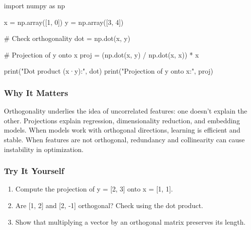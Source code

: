 \documentclass[
  letterpaper,
  DIV=11,
  numbers=noendperiod]{scrreprt}
\newenvironment{Shaded}{\begin{snugshade}}{\end{snugshade}}
\newcommand{\BuiltInTok}[1]{\textcolor[rgb]{0.00,0.23,0.31}{#1}}
\newcommand{\CommentTok}[1]{\textcolor[rgb]{0.37,0.37,0.37}{#1}}
\newcommand{\DecValTok}[1]{\textcolor[rgb]{0.68,0.00,0.00}{#1}}
\newcommand{\ImportTok}[1]{\textcolor[rgb]{0.00,0.46,0.62}{#1}}
\newcommand{\NormalTok}[1]{\textcolor[rgb]{0.00,0.23,0.31}{#1}}
\newcommand{\OperatorTok}[1]{\textcolor[rgb]{0.37,0.37,0.37}{#1}}
\newcommand{\StringTok}[1]{\textcolor[rgb]{0.13,0.47,0.30}{#1}}
\providecommand{\tightlist}{%
  \setlength{\itemsep}{0pt}\setlength{\parskip}{0pt}}
\begin{document}
\begin{Shaded}
\begin{Highlighting}[]
\ImportTok{import}\NormalTok{ numpy }\ImportTok{as}\NormalTok{ np}

\NormalTok{x }\OperatorTok{=}\NormalTok{ np.array([}\DecValTok{1}\NormalTok{, }\DecValTok{0}\NormalTok{])}
\NormalTok{y }\OperatorTok{=}\NormalTok{ np.array([}\DecValTok{3}\NormalTok{, }\DecValTok{4}\NormalTok{])}

\CommentTok{\# Check orthogonality}
\NormalTok{dot }\OperatorTok{=}\NormalTok{ np.dot(x, y)}

\CommentTok{\# Projection of y onto x}
\NormalTok{proj }\OperatorTok{=}\NormalTok{ (np.dot(x, y) }\OperatorTok{/}\NormalTok{ np.dot(x, x)) }\OperatorTok{*}\NormalTok{ x}

\BuiltInTok{print}\NormalTok{(}\StringTok{"Dot product (x·y):"}\NormalTok{, dot)}
\BuiltInTok{print}\NormalTok{(}\StringTok{"Projection of y onto x:"}\NormalTok{, proj)}
\end{Highlighting}
\end{Shaded}

\subsubsection{Why It Matters}\label{why-it-matters-3}

Orthogonality underlies the idea of uncorrelated features: one doesn't
explain the other. Projections explain regression, dimensionality
reduction, and embedding models. When models work with orthogonal
directions, learning is efficient and stable. When features are not
orthogonal, redundancy and collinearity can cause instability in
optimization.

\subsubsection{Try It Yourself}\label{try-it-yourself-105}

\begin{enumerate}
\def\labelenumi{\arabic{enumi}.}
\tightlist
\item
  Compute the projection of y = {[}2, 3{]} onto x = {[}1, 1{]}.
\item
  Are {[}1, 2{]} and {[}2, -1{]} orthogonal? Check using the dot
  product.
\item
  Show that multiplying a vector by an orthogonal matrix preserves its
  length.
\end{enumerate}
\end{document}
